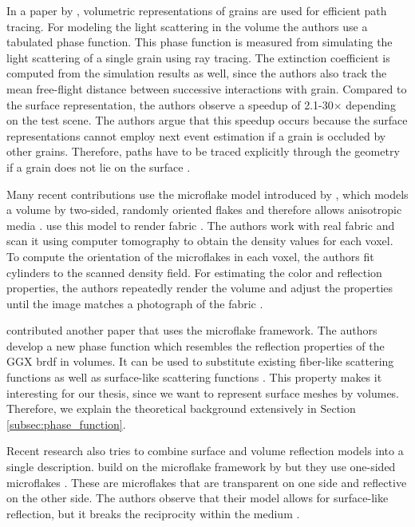 In a paper by \citeauthor{meng_multi_scale_modeling_and_rendering_of_granular_materials}, volumetric representations of grains are used for efficient path tracing.
For modeling the light scattering in the volume the authors use a tabulated phase function.
This phase function is measured from simulating the light scattering of a single grain using ray tracing.
The extinction coefficient is computed from the simulation results as well, since the authors also track the mean free-flight distance between successive interactions with grain.
Compared to the surface representation, the authors observe a speedup of 2.1-30$\times$ depending on the test scene.
The authors argue that this speedup occurs because the surface representations cannot employ next event estimation if a grain is occluded by other grains.
Therefore, paths have to be traced explicitly through the geometry if a grain does not lie on the surface \cite{meng_multi_scale_modeling_and_rendering_of_granular_materials}.

Many recent contributions use the microflake model introduced by \citeauthor{microflake}, which models a volume by two-sided, randomly oriented flakes and therefore allows anisotropic media \cite{microflake}.
\citeauthor{zhao_building_volumetric_appearance_models} use this model to render fabric \cite{zhao_building_volumetric_appearance_models}.
The authors work with real fabric and scan it using computer tomography to obtain the density values for each voxel.
To compute the orientation of the microflakes in each voxel, the authors fit cylinders to the scanned density field.
For estimating the color and reflection properties, the authors repeatedly render the volume and adjust the properties until the image matches a photograph of the fabric \cite{zhao_building_volumetric_appearance_models}.

\citeauthor{sggx} contributed another paper that uses the microflake framework.
The authors develop a new phase function which resembles the reflection properties of the GGX \ac{brdf} in volumes.
It can be used to substitute existing fiber-like scattering functions as well as surface-like scattering functions \cite{sggx}.
This property makes it interesting for our thesis, since we want to represent surface meshes by volumes.
Therefore, we explain the theoretical background extensively in Section \ref{subsec:phase_function}.

Recent research also tries to combine surface and volume reflection models into a single description.
\citeauthor{dupuy_unification_of_microfacet_and_microflake} build on the microflake framework by \citeauthor{microflake} but they use one-sided microflakes \cite{dupuy_unification_of_microfacet_and_microflake}.
These are microflakes that are transparent on one side and reflective on the other side.
The authors observe that their model allows for surface-like reflection, but it breaks the reciprocity within the medium \cite{dupuy_unification_of_microfacet_and_microflake}.

